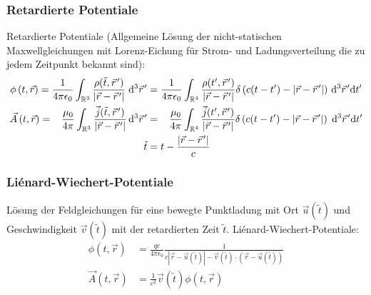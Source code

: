 \documentclass[11pt]{article}
\numberwithin{equation}{section}
\begin{document}
			\subsubsection{Retardierte Potentiale}
				\noindent
				Retardierte Potentiale (Allgemeine Lösung der nicht-statischen Maxwellgleichungen mit Lorenz-Eichung für Strom- und Ladungsverteilung die zu jedem Zeitpunkt bekannt sind):
				\begin{equation}
					\begin{aligned}
						\phi\left(t,\vec{r}\right)
						= \frac{1}{4\pi\epsilon_0} \int_{\mathbb{R}^3} \frac{\rho(\tilde{t},\pvec{r}')}{\left|\vec{r}-\pvec{r}'\right|}\;\diff^3 \pvec{r}'
						&=	\frac{1}{4\pi\epsilon_0} \int_{\mathbb{R}^4} \frac{\rho(t',\pvec{r}')}{\left|\vec{r}-\pvec{r}'\right|}\delta\left( c(t-t')-\left|\vec{r}-\pvec{r}'\right|\right)\,\diff^3 \pvec{r}'\diff t' \\
						\vec{A}\left(t,\vec{r}\right)
						= \phantom{\epsilon_0} \frac{\mu_0}{4\pi} \int_{\mathbb{R}^3} \frac{\vec{j}(\tilde{t},\pvec{r}')}{\left|\vec{r}-\pvec{r}'\right|}\,\diff^3 \pvec{r}'
						&=	\phantom{\epsilon_0} \frac{\mu_0}{4\pi} \int_{\mathbb{R}^4} \frac{\vec{j}(t',\pvec{r}')}{\left|\vec{r}-\pvec{r}'\right|}\delta\left( c(t-t')-\left|\vec{r}-\pvec{r}'\right|\right)\;\diff^3 \pvec{r}'\diff t' \\
						\tilde{t}&=t-\frac{\left|\vec{r}-\pvec{r}'\right|}{c}
					\end{aligned}
				\end{equation}

			\subsubsection{Liénard-Wiechert-Potentiale}

				\noindent
				Lösung der Feldgleichungen für eine bewegte Punktladung mit Ort $\vec{u}(\tilde{t})$ und Geschwindigkeit $\vec{v}(\tilde{t})$ mit der retardierten Zeit $\tilde{t}$. Liénard-Wiechert-Potentiale:
				\begin{equation}
					\begin{aligned}
						\phi(t,\vec{r}) & =\frac{q c}{4\pi \epsilon_0}\frac{1}{c \left|\vec{r}-\vec{u}(\tilde{t})\right|-\vec{v}(\tilde{t})\cdot\left(\vec{r}-\vec{u}(\tilde{t})\right)} \\
						\vec{A}(t,\vec{r}) &= \frac{1}{c^2}\vec{v}(\tilde{t})\phi(t,\vec{r}) \\
					\end{aligned}
				\end{equation}
\end{document}
